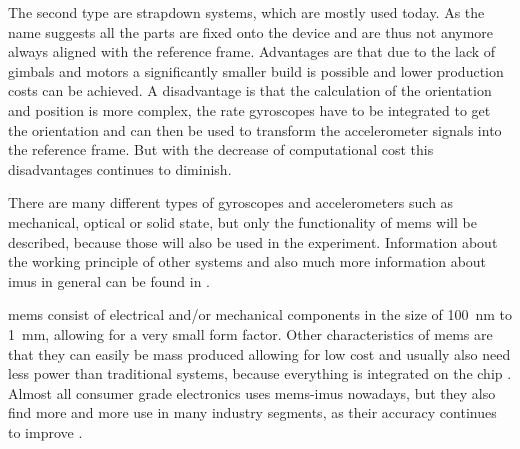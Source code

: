 The second type are strapdown systems, which are mostly used today.
As the name suggests all the parts are fixed onto the device and are thus not anymore always aligned with the reference frame.
Advantages are that due to the lack of gimbals and motors a significantly smaller build is possible and lower production costs can be achieved.
A disadvantage is that the calculation of the orientation and position is more complex, the rate gyroscopes have to be integrated to get the orientation and can then be used to transform the accelerometer signals into the reference frame.
But with the decrease of computational cost this disadvantages continues to diminish.

There are many different types of gyroscopes and accelerometers such as mechanical, optical or solid state, but only the functionality of \gls{mems} will be described, because those will also be used in the experiment.
Information about the working principle of other systems and also much more information about \gls{imu}s in general can be found in \cite{Woodman07anintroduction}.

\gls{mems} consist of electrical and/or mechanical components in the size of \SI{100}{\nano\metre} to \SI{1}{\milli\metre}, allowing for a very small form factor.
Other characteristics of \gls{mems} are that they can easily be mass produced allowing for low cost and usually also need less power than traditional systems, because everything is integrated on the chip \cite{Shaeffer2013}.
Almost all consumer grade electronics uses \gls{mems}-\gls{imu}s nowadays, but they also find more and more use in many industry segments, as their accuracy continues to improve \cite{Perlmutter2016}.


